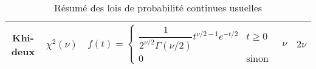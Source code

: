 \begin{table}[h]
\begin{tabularx}{\textwidth}{|c|c|X|c|c|}
        Khi-deux & $\chi^2(\nu)$ & 
        $f(t) = \begin{cases}
            \dfrac{1}{2^{\nu/2} \Gamma(\nu/2)} t^{\nu/2 - 1} e^{-t/2} & t \geq 0 \\
            0 & \text{sinon}
        \end{cases}$ & 
        $\nu$ & 
        $2\nu$ \\
        \hline

    \end{tabularx}
    \caption{Résumé des lois de probabilité continues usuelles}
\end{table}

